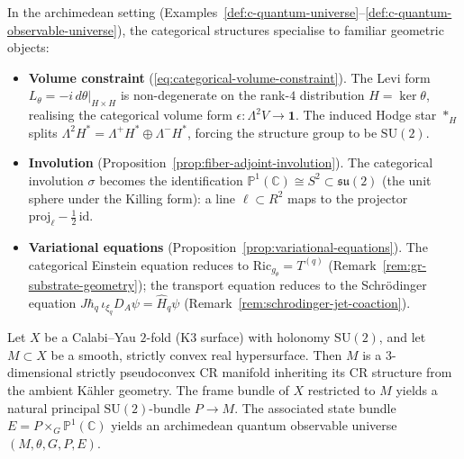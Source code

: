 \begin{remark}
\label{rem:archimedean-realisations}
In the archimedean setting
(Examples~\ref{def:c-quantum-universe}--\ref{def:c-quantum-observable-universe}),
the categorical structures specialise to familiar geometric objects:
\begin{itemize}
  \item \textbf{Volume constraint}
    (\ref{eq:categorical-volume-constraint}).\;
    The Levi form $L_\theta = -i\,d\theta|_{H \times H}$ is non-degenerate
    on the rank-$4$ distribution $H = \ker\theta$, realising the
    categorical volume form
    $\epsilon \colon \Lambda^2 V \to \mathbf{1}$.  The induced Hodge star
    $*_H$ splits $\Lambda^2 H^* = \Lambda^+\!H^* \oplus \Lambda^-\!H^*$,
    forcing the structure group to be $\mathrm{SU}(2)$.
    \label{rem:volume-constraint-geometric}
  \item \textbf{Involution}
    (Proposition~\ref{prop:fiber-adjoint-involution}).\;
    The categorical involution $\sigma$ becomes the identification
    $\mathbb{P}^1(\mathbb{C}) \cong S^2 \subset \mathfrak{su}(2)$ (the unit sphere
    under the Killing form): a line $\ell \subset R^2$ maps to the
    projector $\mathrm{proj}_\ell - \tfrac12\,\mathrm{id}$.
    \label{rem:fiber-adjoint-archimedean}
  \item \textbf{Variational equations}
    (Proposition~\ref{prop:variational-equations}).\;
    The categorical Einstein equation reduces to
    $\mathrm{Ric}_{g_\theta} = T^{(q)}$
    (Remark~\ref{rem:gr-substrate-geometry}); the transport equation
    reduces to the Schr\"odinger equation
    $J\hbar_q\,\iota_{\xi_q} D_A \psi = \hat{H}_q \psi$
    (Remark~\ref{rem:schrodinger-jet-coaction}).
    \label{rem:variational-archimedean}
\end{itemize}
\end{remark}

\begin{example}
\label{ex:calabi-yau}
Let $X$ be a Calabi--Yau $2$-fold (K3 surface) with holonomy
$\mathrm{SU}(2)$, and let $M \subset X$ be a smooth, strictly convex real
hypersurface.  Then $M$ is a $3$-dimensional strictly pseudoconvex CR
manifold inheriting its CR structure from the ambient K\"ahler geometry.
The frame bundle of $X$ restricted to $M$ yields a natural principal
$\mathrm{SU}(2)$-bundle $P \to M$.  The associated state bundle
$E = P \times_G \mathbb{P}^1(\mathbb{C})$ yields an archimedean quantum
observable universe $(M, \theta, G, P, E)$.
\end{example}

